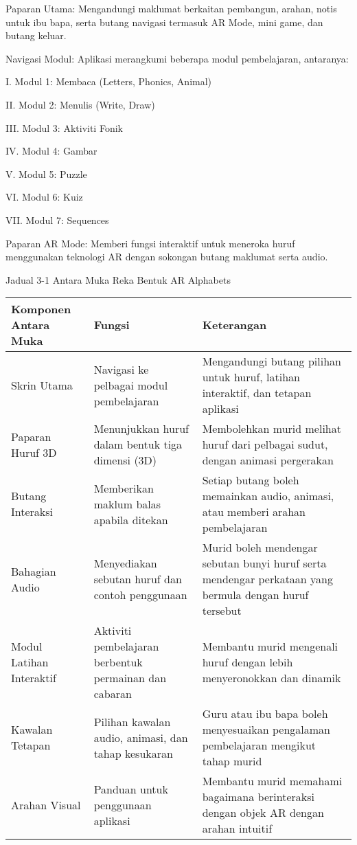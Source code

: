 \begin{itemize}
\begin{itemize}
\begin{itemize}
\begin{itemize}
\begin{itemize}
\begin{itemize}
\begin{itemize}
\begin{itemize}
\begin{flushleft}
Paparan Utama: Mengandungi maklumat berkaitan pembangun, arahan, notis untuk ibu bapa, serta butang navigasi termasuk AR Mode, mini game, dan butang keluar.

Navigasi Modul: Aplikasi merangkumi beberapa modul pembelajaran, antaranya:

I. Modul 1: Membaca (Letters, Phonics, Animal)

II. Modul 2: Menulis (Write, Draw)

III. Modul 3: Aktiviti Fonik

IV. Modul 4: Gambar

V. Modul 5: Puzzle

VI. Modul 6: Kuiz

VII. Modul 7: Sequences

Paparan AR Mode: Memberi fungsi interaktif untuk meneroka huruf menggunakan teknologi AR dengan sokongan butang maklumat serta audio.

   Jadual 3-1 Antara Muka Reka Bentuk AR Alphabets


\begin{table}
\centering

\begin{tabular}{l l l}\toprule
Komponen Antara Muka & Fungsi & Keterangan \\
\midrule
Skrin Utama & Navigasi ke pelbagai modul pembelajaran & Mengandungi butang pilihan untuk huruf, latihan interaktif, dan tetapan aplikasi \\
Paparan Huruf 3D & Menunjukkan huruf dalam bentuk tiga dimensi (3D) & Membolehkan murid melihat huruf dari pelbagai sudut, dengan animasi pergerakan \\
Butang Interaksi & Memberikan maklum balas apabila ditekan & Setiap butang boleh memainkan audio, animasi, atau memberi arahan pembelajaran \\
Bahagian Audio & Menyediakan sebutan huruf dan contoh penggunaan & Murid boleh mendengar sebutan bunyi huruf serta mendengar perkataan yang bermula dengan huruf tersebut \\
Modul Latihan Interaktif & Aktiviti pembelajaran berbentuk permainan dan cabaran & Membantu murid mengenali huruf dengan lebih menyeronokkan dan dinamik \\
Kawalan Tetapan & Pilihan kawalan audio, animasi, dan tahap kesukaran & Guru atau ibu bapa boleh menyesuaikan pengalaman pembelajaran mengikut tahap murid \\
Arahan Visual & Panduan untuk penggunaan aplikasi & Membantu murid memahami bagaimana berinteraksi dengan objek AR dengan arahan intuitif \\ \bottomrule




\end{tabular}
\end{table}
\end{flushleft}
\end{itemize}
\end{itemize}
\end{itemize}
\end{itemize}
\end{itemize}
\end{itemize}
\end{itemize}
\end{itemize}
